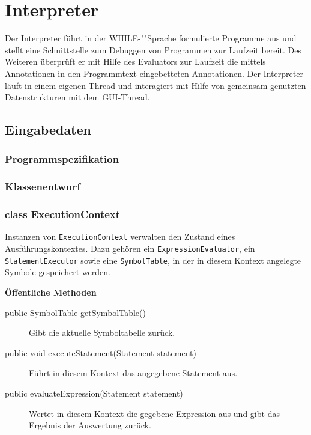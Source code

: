 \section{Interpreter}

Der Interpreter führt in der WHILE-""Sprache formulierte Programme aus und stellt eine Schnittstelle zum Debuggen von Programmen zur Laufzeit bereit. Des Weiteren überprüft er mit Hilfe des Evaluators zur Laufzeit die mittels Annotationen in den Programmtext eingebetteten Annotationen. Der Interpreter läuft in einem eigenen Thread und interagiert mit Hilfe von gemeinsam genutzten Datenstrukturen mit dem GUI-Thread.

\subsection{Eingabedaten}

\subsubsection{Programmspezifikation}


\subsubsection{Klassenentwurf}

\subsubsection{class ExecutionContext}
Instanzen von \texttt{ExecutionContext} verwalten den Zustand eines Ausführungskontextes. Dazu gehören ein \texttt{ExpressionEvaluator}, ein \texttt{StatementExecutor} sowie eine \texttt{SymbolTable}, in der in diesem Kontext angelegte Symbole gespeichert werden.

\textbf{Öffentliche Methoden}
\begin{description}
    \item[public SymbolTable getSymbolTable()]
    Gibt die aktuelle Symboltabelle zurück.

    \item[public void executeStatement(Statement statement)]
    Führt in diesem Kontext das angegebene Statement aus.

    \item[public evaluateExpression(Statement statement)]
    Wertet in diesem Kontext die gegebene Expression aus und gibt das Ergebnis der Auswertung zurück.
\end{description}

